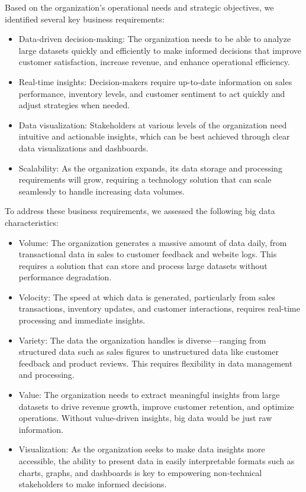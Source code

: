 Based on the organization’s operational needs and strategic objectives, we identified several key business requirements:
\begin{itemize}
    \item 

Data-driven decision-making: The organization needs to be able to analyze large datasets quickly and efficiently to make informed decisions that improve customer satisfaction, increase revenue, and enhance operational efficiency.
\item Real-time insights: Decision-makers require up-to-date information on sales performance, inventory levels, and customer sentiment to act quickly and adjust strategies when needed.
\item Data visualization: Stakeholders at various levels of the organization need intuitive and actionable insights, which can be best achieved through clear data visualizations and dashboards.
\item Scalability: As the organization expands, its data storage and processing requirements will grow, requiring a technology solution that can scale seamlessly to handle increasing data volumes.
\end{itemize}
To address these business requirements, we assessed the following big data characteristics:
\begin{itemize}
    \item 

Volume: The organization generates a massive amount of data daily, from transactional data in sales to customer feedback and website logs. This requires a solution that can store and process large datasets without performance degradation.
\item Velocity: The speed at which data is generated, particularly from sales transactions, inventory updates, and customer interactions, requires real-time processing and immediate insights.
\item Variety: The data the organization handles is diverse—ranging from structured data such as sales figures to unstructured data like customer feedback and product reviews. This requires flexibility in data management and processing.
\item Value: The organization needs to extract meaningful insights from large datasets to drive revenue growth, improve customer retention, and optimize operations. Without value-driven insights, big data would be just raw information.
\item Visualization: As the organization seeks to make data insights more accessible, the ability to present data in easily interpretable formats such as charts, graphs, and dashboards is key to empowering non-technical stakeholders to make informed decisions.
\end{itemize}
\newpage